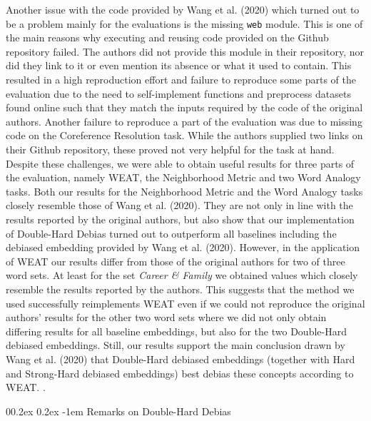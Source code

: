 \documentclass[
  english,
  man,floatsintext]{apa6}
\makeatletter
\let\oldparagraph\paragraph
\renewcommand{\paragraph}[1]{\oldparagraph{#1}\mbox{}}
\renewcommand{\paragraph}{\@startsection{paragraph}{4}{\parindent}%
  {0\baselineskip \@plus 0.2ex \@minus 0.2ex}%
  {-1em}%
  {\normalfont\normalsize\bfseries\itshape\typesectitle}}
\makeatother
\begin{document}
Another issue with the code provided by Wang et al. (2020) which turned out to be a problem mainly for the evaluations is the missing \texttt{web} module. This is one of the main reasons why executing and reusing code provided on the Github repository failed. The authors did not provide this module in their repository, nor did they link to it or even mention its absence or what it used to contain. This resulted in a high reproduction effort and failure to reproduce some parts of the evaluation due to the need to self-implement functions and preprocess datasets found online such that they match the inputs required by the code of the original authors.
Another failure to reproduce a part of the evaluation was due to missing code on the Coreference Resolution task. While the authors supplied two links on their Github repository, these proved not very helpful for the task at hand.
Despite these challenges, we were able to obtain useful results for three parts of the evaluation, namely WEAT, the Neighborhood Metric and two Word Analogy tasks. Both our results for the Neighborhood Metric and the Word Analogy tasks closely resemble those of Wang et al. (2020). They are not only in line with the results reported by the original authors, but also show that our implementation of Double-Hard Debias turned out to outperform all baselines including the debiased embedding provided by Wang et al. (2020). However, in the application of WEAT our results differ from those of the original authors for two of three word sets. At least for the set \emph{Career \& Family} we obtained values which closely resemble the results reported by the authors. This suggests that the method we used successfully reimplements WEAT even if we could not reproduce the original authors' results for the other two word sets where we did not only obtain differing results for all baseline embeddings, but also for the two Double-Hard debiased embeddings. Still, our results support the main conclusion drawn by Wang et al. (2020) that Double-Hard debiased embeddings (together with Hard and Strong-Hard debiased embeddings) best debias these concepts according to WEAT. .

\hypertarget{remarks-on-double-hard-debias}{%
\paragraph{Remarks on Double-Hard Debias}\label{remarks-on-double-hard-debias}}
\end{document}
